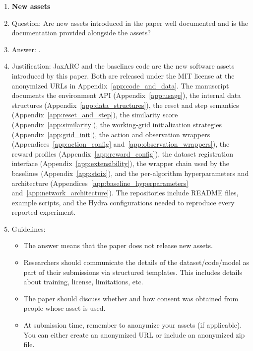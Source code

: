 \begin{enumerate}
\item {\bf New assets}
    \item[] Question: Are new assets introduced in the paper well documented and is the documentation provided alongside the assets?
    \item[] Answer: \answerYes{}.
    \item[] Justification: JaxARC and the baselines code are the new software assets introduced by this paper. Both are released under the MIT license at the anonymized URLs in Appendix~\ref{app:code_and_data}. The manuscript documents the environment API (Appendix~\ref{app:usage}), the internal data structures (Appendix~\ref{app:data_structures}), the reset and step semantics (Appendix~\ref{app:reset_and_step}), the similarity score (Appendix~\ref{app:similarity}), the working-grid initialization strategies (Appendix~\ref{app:grid_init}), the action and observation wrappers (Appendices~\ref{app:action_config} and~\ref{app:observation_wrappers}), the reward profiles (Appendix~\ref{app:reward_config}), the dataset registration interface (Appendix~\ref{app:extensibility}), the wrapper chain used by the baselines (Appendix~\ref{app:stoix}), and the per-algorithm hyperparameters and architecture (Appendices~\ref{app:baseline_hyperparameters} and~\ref{app:network_architecture}). The repositories include README files, example scripts, and the Hydra configurations needed to reproduce every reported experiment.
    \item[] Guidelines:
    \begin{itemize}
        \item The answer \answerNA{} means that the paper does not release new assets.
        \item Researchers should communicate the details of the dataset\slash code\slash model as part of their submissions via structured templates. This includes details about training, license, limitations, etc. 
        \item The paper should discuss whether and how consent was obtained from people whose asset is used.
        \item At submission time, remember to anonymize your assets (if applicable). You can either create an anonymized URL or include an anonymized zip file.
    \end{itemize}


\end{enumerate}
